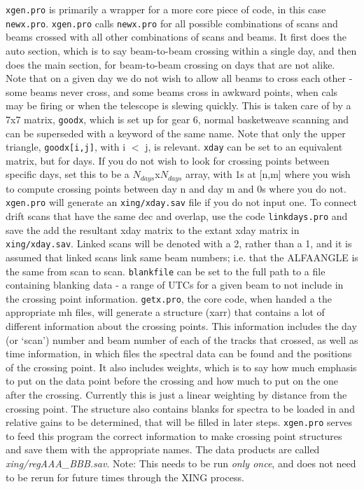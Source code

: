 \documentclass[11pt]{article}
\begin{document}
\texttt{xgen.pro} is primarily a wrapper for a more core piece of code, in this case \texttt{newx.pro}. \texttt{xgen.pro} calls \texttt{newx.pro} for all possible combinations of scans and beams crossed with all other combinations of scans and beams. It first does the auto section, which is to say beam-to-beam crossing within a single day, and then does the main section, for beam-to-beam crossing on days that are not alike. Note that on a given day we do not wish to allow all beams to cross each other - some beams never cross, and some beams cross in awkward points, when cals may be firing or when the telescope is slewing quickly.  This is taken care of by a 7x7 matrix, \texttt{goodx}, which is set up for gear 6, normal basketweave scanning and can be superseded with a keyword of the same name. Note that only the upper triangle, \texttt{goodx[i,j]}, with i $<$ j, is relevant. \texttt{xday} can be set to an equivalent matrix, but for days. If you do not wish to look for crossing points between specific days, set this to be a $N_{days}$x$N_{days}$ array, with 1s at [n,m] where you wish to compute crossing points between day n and day m and 0s where you do not. \texttt{xgen.pro} will generate an \texttt{xing/xday.sav} file if you do not input one. To connect drift scans that have the same dec and overlap, use the code \texttt{linkdays.pro} and save the add the resultant xday matrix to the extant xday matrix in \texttt{xing/xday.sav}. Linked scans will be denoted with a 2, rather than a 1, and it is assumed that linked scans link same beam numbers; i.e. that the ALFAANGLE is the same from scan to scan. \texttt{blankfile} can be set to the full path to a file containing blanking data - a range of UTCs for a given beam to not include in the crossing point information. \texttt{getx.pro}, the core code, when handed a the appropriate mh files, will generate a structure (xarr) that contains a lot of different information about the crossing points. This information includes the day (or `scan') number and beam number of each of the tracks that crossed, as well as time information, in which files the spectral data can be found and the positions of the crossing point. It also includes weights, which is to say how much emphasis to put on the data point before the crossing and how much to put on the one after the crossing. Currently this is just a linear weighting by distance from the crossing point. The structure also contains blanks for spectra to be loaded in and relative gains to be determined, that will be filled in later steps. \texttt{xgen.pro} serves to feed this program the correct information to make crossing point structures and save them with the appropriate names. The data products are called {\it xing/regAAA\_BBB.sav}. Note: This needs to be run \emph{only once}, and does not need to be rerun for future times through the XING process.
\end{document}
